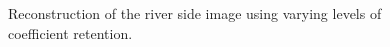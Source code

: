 \documentclass[11pt]{article}
\begin{document}
\begin{figure}[H]
    \caption{Reconstruction of the river side image using varying levels of coefficient retention.}
    \label{fig:thresholded_reconstruction}
\end{figure}


\end{document}
